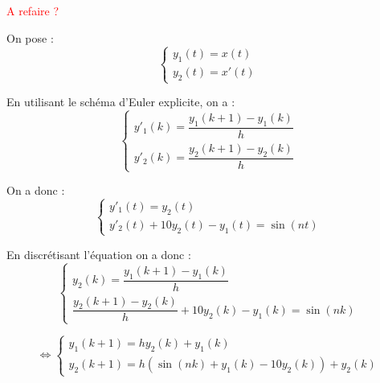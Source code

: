 \documentclass[10pt,fleqn]{article} %
\begin{document}
\begin{corrige}
\textcolor{red}{A refaire ?}


On pose : 
$$\left\{
\begin{array}{l}
y_1(t) = x(t) \\
y_2(t) = x'(t)
\end{array}
\right.
$$

En utilisant le schéma d'Euler explicite, on a :
$$\left\{
\begin{array}{l}
y'_1(k)=\dfrac{y_1(k+1)-y_1(k)}{h} \\
y'_2(k)=\dfrac{y_2(k+1)-y_2(k)}{h}
\end{array}
\right.
$$

On a donc : 
$$\left\{
\begin{array}{l}
y'_1(t)=y_2(t) \\
y'_2(t)+10y_2(t) - y_1(t) = \sin \left(nt\right)
\end{array}
\right.
$$

En discrétisant l'équation on a donc : 
$$\left\{
\begin{array}{l}
y_2(k) =\dfrac{y_1(k+1)-y_1(k)}{h} \\
\dfrac{y_2(k+1)-y_2(k)}{h} +10y_2(k) - y_1(k) = \sin \left(nk\right)
\end{array}
\right.
$$

$$\Leftrightarrow
\left\{
\begin{array}{l}
y_1(k+1) = hy_2(k)+y_1(k) \\
y_2(k+1)  = h \left(  \sin \left(nk\right)+ y_1(k)-10y_2(k) \right)+y_2(k)
\end{array}
\right.
$$

\end{corrige}
\end{document}
